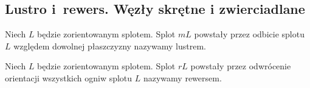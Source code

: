 
\subsection{Lustro i~rewers. Węzły skrętne i zwierciadlane}
\begin{definition}[lustro]
%
    Niech $L$ będzie zorientowanym splotem.
    Splot $mL$ powstały przez odbicie splotu $L$ względem dowolnej płaszczyzny nazywamy lustrem.
\end{definition}

\begin{definition}[rewers]
%
%
    Niech $L$ będzie zorientowanym splotem.
    Splot $rL$ powstały przez odwrócenie orientacji wszystkich ogniw splotu $L$ nazywamy rewersem.
\end{definition}

